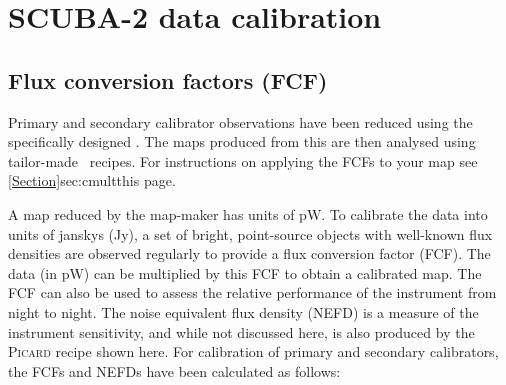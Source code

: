 \chapter{SCUBA-2 data calibration}
\label{app:cal}

\section{Flux conversion factors (FCF)}
\label{app:fcf}

Primary and secondary calibrator observations have been reduced using
the specifically designed .  The
maps produced from this are then analysed using tailor-made \picard\
recipes. For instructions on applying the FCFs to your map see
\cref{Section}{sec:cmult}{this page}.

A map reduced by the map-maker has units of pW. To calibrate the data
into units of janskys (Jy), a set of bright, point-source objects with
well-known flux densities are observed regularly to provide a flux
conversion factor (FCF). The data (in pW) can be multiplied by this
FCF to obtain a calibrated map. The FCF can also be used to assess the
relative performance of the instrument from night to night. The noise
equivalent flux density (NEFD) is a measure of the instrument
sensitivity, and while not discussed here, is also produced by the
\textsc{Picard} recipe shown here. For calibration of primary and
secondary calibrators, the FCFs and NEFDs have been calculated as
follows:

